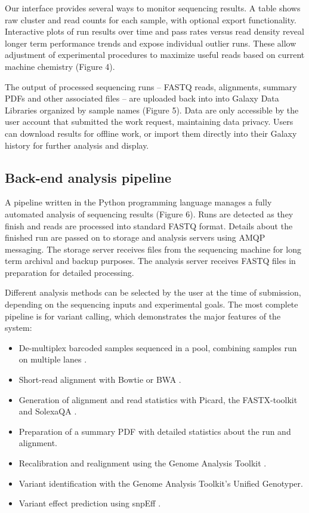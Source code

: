 \documentclass[10pt]{bmc_article}
\newenvironment{bmcformat}{\begin{raggedright}\baselineskip20pt\sloppy\setboolean{publ}{false}}{\end{raggedright}\baselineskip20pt\sloppy}
\begin{document}
\begin{bmcformat}
Our interface provides several ways to monitor sequencing results.
A table shows raw cluster and read counts for each sample, with
optional export functionality.  Interactive plots of run results over
time and pass rates versus read density reveal longer term performance
trends and expose individual outlier runs. These allow adjustment of
experimental procedures to maximize useful reads based on current
machine chemistry (Figure 4).

The output of processed sequencing runs -- FASTQ reads, alignments,
summary PDFs and other associated files -- are uploaded back
into into Galaxy Data Libraries organized by sample names (Figure
5). Data are only accessible by the user account that submitted the
work request, maintaining data privacy. Users can download results for
offline work, or import them directly into their Galaxy history for
further analysis and display.

\subsection*{Back-end analysis pipeline}

A pipeline written in the Python programming language manages a fully
automated analysis of sequencing results (Figure 6). Runs are detected
as they finish and reads are processed into standard FASTQ
format. Details about the finished run are passed on to storage and
analysis servers using AMQP messaging. The storage server receives
files from the sequencing machine for long term archival and backup
purposes. The analysis server receives FASTQ files in preparation for
detailed processing.

Different analysis methods can be selected by the user at the time of
submission, depending on the sequencing inputs and experimental
goals. The most complete pipeline is for variant calling, which
demonstrates the major features of the system:

\begin{itemize}
  \item De-multiplex barcoded samples sequenced in a pool, combining
    samples run on multiple lanes \cite{cock_biopython:_2009}.
  \item Short-read alignment with Bowtie or BWA
    \cite{langmead_ultrafast_2009,li_fast_2009}.
  \item Generation of alignment and read statistics with Picard, the
    FASTX-toolkit and SolexaQA
    \cite{_picard_????,_fastx-toolkit_????,cox_solexaqa:_2010}.
  \item Preparation of a summary PDF with detailed statistics
    about the run and alignment.
  \item Recalibration and realignment using the Genome Analysis
    Toolkit
    \cite{mckenna_genome_2010,_pysam_????,gautier_intuitive_2010}.
  \item Variant identification with the Genome Analysis Toolkit's
    Unified Genotyper.
  \item Variant effect prediction using snpEff \cite{_snpeff_????}.
\end{itemize}


\end{bmcformat}
\end{document}
